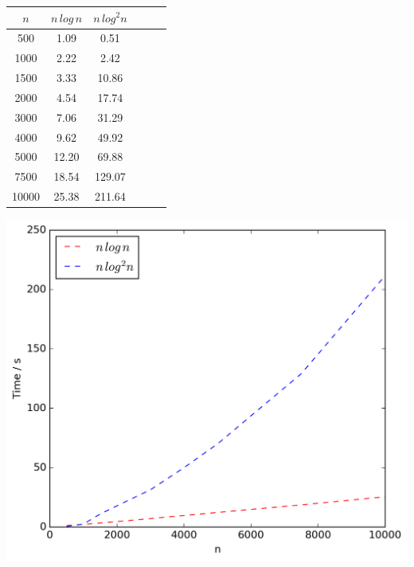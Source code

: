 \documentclass[12pt,a4paper]{article}
\begin{document}
\begin{table}[!ht]
\begin{minipage}{0.48\textwidth}
\begin{tabular}{c||ccccc}
                $n$ & $n\,log\,n$ & $n\,log^2n$\\
                \hline\hline
                500 & 1.09 & 0.51\\
                1000 & 2.22 & 2.42\\
                1500 & 3.33 & 10.86\\
                2000 & 4.54 & 17.74\\
                3000 & 7.06 & 31.29\\
                4000 & 9.62 & 49.92\\
                5000 & 12.20 & 69.88\\
                7500 & 18.54 & 129.07\\
                10000 & 25.38 & 211.64\\
            \end{tabular}
            \includegraphics[scale=0.4]{varyingn1_filter}
        \end{minipage}
        \label{fig:expresults1}
    \end{table}
\end{document}
